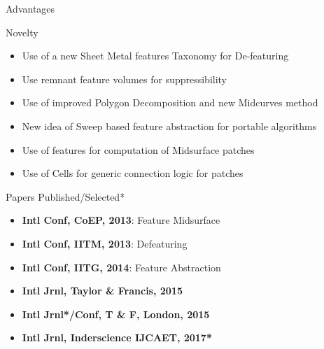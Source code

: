 \documentclass[final]{beamer}
\newlength{\onecolumnwidth}
\begin{document}
\begin{frame}[t]
\begin{columns}[t]
\begin{column}{\onecolumnwidth}
\begin{block}{Advantages}
\begin{itemize}
		\end{itemize}
		
	\end{block}

%	
%		
%			
%		

	\begin{alertblock}{Novelty}
	
		\begin{itemize}
		
			\item Use of a new Sheet Metal features Taxonomy for De-featuring
			\item Use remnant feature volumes for suppressibility
			\item Use of improved Polygon Decomposition and new Midcurves method
			\item New idea of Sweep based feature abstraction for portable algorithms
			\item Use of features for computation of Midsurface patches
			\item Use of Cells for generic connection logic for patches
			
		\end{itemize} 
		
	\end{alertblock}
		
	\begin{block}{Papers Published/Selected*}
	
		\begin{itemize}
		
			\item \textbf{Intl Conf, CoEP, 2013}: Feature Midsurface
			\item \textbf{Intl Conf, IITM, 2013}: Defeaturing
			\item \textbf{Intl Conf, IITG, 2014}:  Feature Abstraction
			\item \textbf{Intl Jrnl, Taylor \& Francis, 2015}
			\item \textbf{Intl Jrnl*/Conf, T \& F, London, 2015}
			\item \textbf{Intl Jrnl, Inderscience IJCAET, 2017*}
			

\end{itemize}
\end{block}
\end{column}
\end{columns}
\end{frame}
\end{document}
